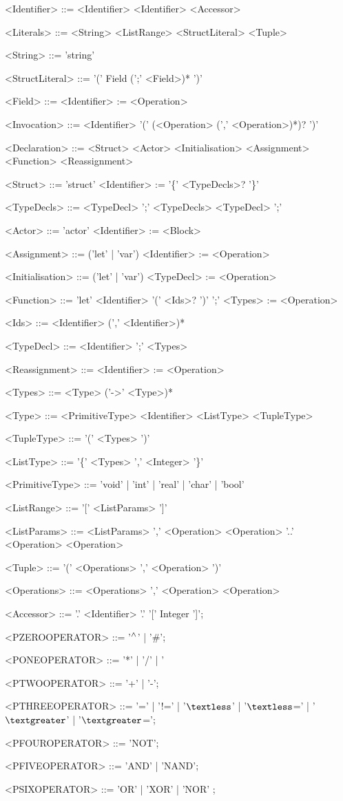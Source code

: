 \begin{grammar}
<Identifier> ::= <Identifier>
 \alt <Identifier> <Accessor>

<Literals> ::= <String>
 \alt <ListRange>
 \alt <StructLiteral>
 \alt <Tuple>

<String> ::= 'string'

<StructLiteral> ::= '(' Field (';' <Field>)* ')'

<Field> ::= <Identifier> := <Operation> 

<Invocation> ::= <Identifier> '(' (<Operation> (',' <Operation>)*)? ')'

<Declaration> ::= <Struct>
 \alt <Actor>
 \alt <Initialisation>
 \alt <Assignment>
 \alt <Function>
 \alt <Reassignment>

<Struct> ::= 'struct' <Identifier> := '\{' <TypeDecls>? '\}'

<TypeDecls> ::= <TypeDecl> ';' <TypeDecls>
 \alt <TypeDecl> ';'

<Actor> ::= 'actor' <Identifier> := <Block>

<Assignment> ::= ('let' | 'var') <Identifier> := <Operation>

<Initialisation> ::= ('let' | 'var') <TypeDecl> := <Operation>

<Function> ::= 'let' <Identifier> '(' <Ids>? ')' ';' <Types> := <Operation>

<Ids> ::= <Identifier> (',' <Identifier>)*

<TypeDecl> ::= <Identifier> ';' <Types>

<Reassignment> ::= <Identifier> := <Operation>

<Types> ::= <Type> ('->' <Type>)*

<Type> ::= <PrimitiveType>
 \alt <Identifier>
 \alt <ListType>
 \alt <TupleType>

<TupleType> ::= '(' <Types> ')'

<ListType> ::= '\{' <Types> ',' <Integer> '\}'

<PrimitiveType> ::= 'void' | 'int' | 'real' | 'char' | 'bool'

<ListRange> ::= '[' <ListParams> ']'

<ListParams> ::= <ListParams> ',' <Operation>
 \alt <Operation> '..' <Operation>
 \alt <Operation>

<Tuple> ::= '(' <Operations> ',' <Operation> ')'

<Operations> ::= <Operations> ',' <Operation>
 \alt <Operation>

<Accessor> ::= '.' <Identifier>
 \alt '.' '[' Integer ']';

<PZEROOPERATOR> ::= '$\mathbin{^\wedge{}}$' | '\#';

<PONEOPERATOR> ::= '*' | '/' | '%

<PTWOOPERATOR> ::= '+' | '-';

<PTHREEOPERATOR> ::= '=' | '!=' | '$\textless$' | '$\textless$=' | '$\textgreater$' | '$\textgreater$=';

<PFOUROPERATOR> ::= 'NOT';

<PFIVEOPERATOR> ::= 'AND' | 'NAND';

<PSIXOPERATOR> ::= 'OR' | 'XOR' | 'NOR' ;

\end{grammar}